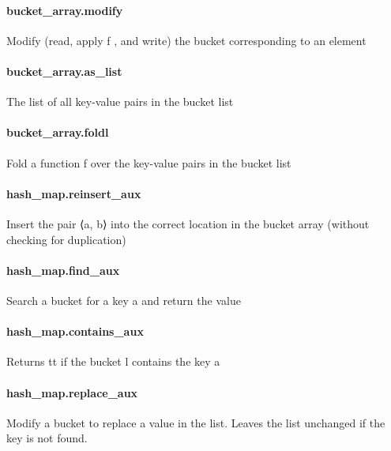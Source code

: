 \documentclass{article}
\begin{document}
\paragraph{bucket\_array.modify}
\par
Modify (read, apply 
\colorbox[RGB]{253,246,227}{{{{\color[RGB]{101, 123, 131} f }}}}, and write) the bucket corresponding to an element
\paragraph{bucket\_array.as\_list}
\par
The list of all key-value pairs in the bucket list
\paragraph{bucket\_array.foldl}
\par
Fold a function 
\colorbox[RGB]{253,246,227}{{{{\color[RGB]{101, 123, 131} f }}}} over the key-value pairs in the bucket list
\paragraph{hash\_map.reinsert\_aux}
\par
Insert the pair 
\colorbox[RGB]{253,246,227}{{{{\color[RGB]{101, 123, 131} ⟨a, b⟩ }}}} into the correct location in the bucket array
(without checking for duplication)
\paragraph{hash\_map.find\_aux}
\par
Search a bucket for a key 
\colorbox[RGB]{253,246,227}{{{{\color[RGB]{101, 123, 131} a }}}} and return the value
\paragraph{hash\_map.contains\_aux}
\par
Returns 
\colorbox[RGB]{253,246,227}{{{{\color[RGB]{101, 123, 131} tt }}}} if the bucket 
\colorbox[RGB]{253,246,227}{{{{\color[RGB]{101, 123, 131} l }}}} contains the key 
\colorbox[RGB]{253,246,227}{{{{\color[RGB]{101, 123, 131} a }}}}\paragraph{hash\_map.replace\_aux}
\par
Modify a bucket to replace a value in the list. Leaves the list
unchanged if the key is not found.
\end{document}
